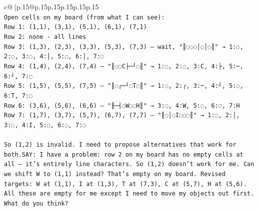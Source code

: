 \documentclass{article}
\begin{document}
{\begin{supertabular}{c@{$\;$}|p{.15\linewidth}@{}p{.15\linewidth}p{.15\linewidth}p{.15\linewidth}p{.15\linewidth}p{.15\linewidth}}
{{{\\ 
\texttt{Open cells on my board (from what I can see):} \\
\texttt{Row 1: (1,1), (3,1), (5,1), (6,1), (7,1)} \\
\texttt{Row 2: none {-} all lines} \\
\texttt{Row 3: (1,3), (2,3), (3,3), (5,3), (7,3) — wait, "║◌◌◌│◌│◌║" → 1:◌, 2:◌, 3:◌, 4:│, 5:◌, 6:│, 7:◌} \\
\texttt{Row 4: (1,4), (2,4), (7,4) — "║◌◌C├─┘◌║" → 1:◌, 2:◌, 3:C, 4:├, 5:─, 6:┘, 7:◌} \\
\texttt{Row 5: (1,5), (5,5), (7,5) — "║◌┌─┘◌T◌║" → 1:◌, 2:┌, 3:─, 4:┘, 5:◌, 6:T, 7:◌} \\
\texttt{Row 6: (3,6), (5,6), (6,6) — "╟─┤◌W◌◌H║" → 3:◌, 4:W, 5:◌, 6:◌, 7:H} \\
\texttt{Row 7: (1,7), (3,7), (5,7), (6,7), (7,7) — "║◌│◌I◌◌◌║" → 1:◌, 2:│, 3:◌, 4:I, 5:◌, 6:◌, 7:◌} \\
\\ 
\texttt{So (1,2) is invalid. I need to propose alternatives that work for both.SAY: I have a problem: row 2 on my board has no empty cells at all — it's entirely line characters. So (1,2) doesn't work for me. Can we shift W to (1,1) instead? That's empty on my board. Revised targets: W at (1,1), I at (1,3), T at (7,3), C at (5,7), H at (5,6). All these are empty for me except I need to move my objects out first. What do you think?} \\
            }
        }
    }
     \\ \\


\end{supertabular}}
\end{document}
